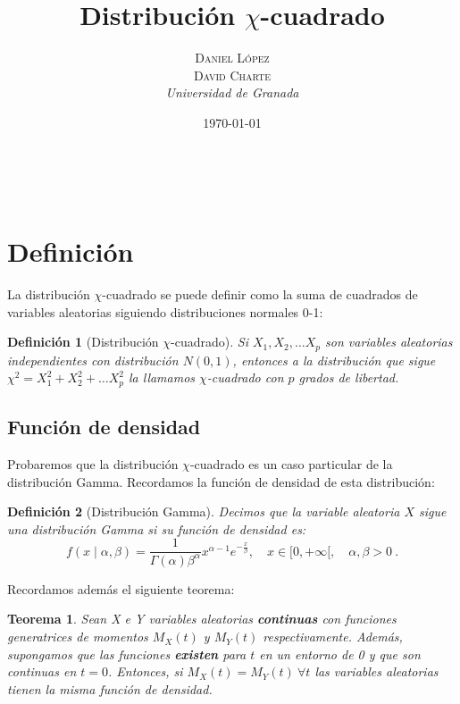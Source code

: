 \documentclass[a4paper, 10pt]{article} %
\title{\textbf{Distribución $\chi$-cuadrado}\\ %
\vspace{20 pt}
} %
\author{\textsc{Daniel López\\
David Charte} %
\\{\textit{Universidad de Granada}}} %
\date{\today} %
\makeatletter
\renewcommand{\maketitle}{ %
\begin{center} %
{\Huge\@title} %
\end{center}

\vspace{20pt} %

\begin{flushright} %
{\large\@author} %
\\\@date %

\vspace{40pt} %
\end{flushright}
\renewcommand{\baselinestretch}{0.5}

}
\newtheorem{theorem}{Teorema}[section]
\newtheorem{definition}{Definición}[section]
\makeatother
\begin{document}
\maketitle
\tableofcontents
\setcounter{page}{1}
\pagebreak

\section{Definición}

La distribución $\chi$-cuadrado se puede definir como la suma de cuadrados de variables aleatorias siguiendo distribuciones normales 0-1:

\begin{definition}[Distribución $\chi$-cuadrado]
  Si $X_1,X_2,\dots X_p$ son variables aleatorias independientes con distribución $N(0,1)$, entonces a la distribución que sigue $\chi^2=X_1^2+X_2^2+\dots X_p^2$ la llamamos $\chi$-cuadrado con $p$ grados de libertad.
\end{definition}

\subsection{Función de densidad}
Probaremos que la distribución $\chi$-cuadrado es un caso particular de la distribución Gamma. Recordamos la función de densidad de esta distribución:

\begin{definition}[Distribución Gamma]
  Decimos que la variable aleatoria $X$ sigue una distribución Gamma si su función de densidad es:
  $$f(x\mid \alpha, \beta) = \frac 1 {\Gamma(\alpha)\beta^\alpha}x^{\alpha-1}e^{-\frac x \beta},\quad x\in[0,+\infty[,\quad \alpha,\beta>0~.$$
\end{definition}

Recordamos además el siguiente teorema:
\begin{theorem}
  Sean X e Y variables aleatorias \textbf{continuas} con funciones generatrices de momentos $M_X(t)$ y $M_Y(t)$ respectivamente. Además, supongamos que las funciones \textbf{existen} para $t$ en un entorno de 0 y que son continuas en $t=0$. Entonces, si $M_X(t)=M_Y(t)~\forall t$ las variables aleatorias tienen la misma función de densidad.
\end{theorem}
\end{document}
